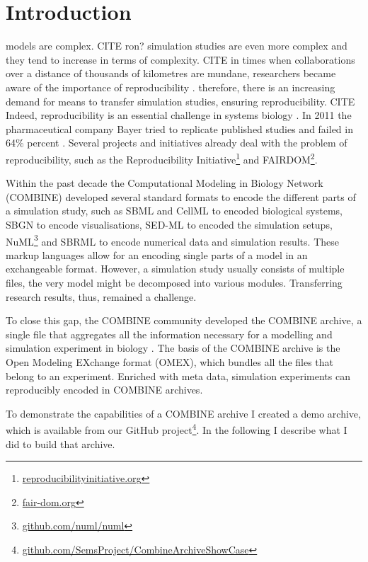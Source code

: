 
\section{Introduction}

models are complex. CITE ron?
simulation studies are even more complex and they tend to increase in terms of complexity. CITE
in times when collaborations over a distance of thousands of kilometres are mundane, researchers became aware of the importance of reproducibility \cite{Sandve2013}.
therefore, there is an increasing demand for means to transfer simulation studies, ensuring reproducibility. CITE
Indeed, reproducibility is an essential challenge in systems biology \cite{Mesirov2010}.
In 2011 the pharmaceutical company Bayer tried to replicate published studies and failed in 64\% percent \cite{Prinz2011}.
Several projects and initiatives already deal with the problem of reproducibility, such as the Reproducibility Initiative\footnote{\href{http://reproducibilityinitiative.org/}{reproducibilityinitiative.org}} and FAIRDOM\footnote{\href{http://fair-dom.org/}{fair-dom.org}}.

Within the past decade the Computational Modeling in Biology Network (COMBINE) developed several standard formats to encode the different parts of a simulation study, such as SBML \cite{Hucka2003} and CellML \cite{Cuellar2003a} to encoded biological systems, SBGN \cite{sbgn} to encode visualisations, SED-ML \cite{Waltemath2011} to encoded the simulation setups, NuML\footnote{\href{https://github.com/numl/numl}{github.com/numl/numl}} and SBRML \cite{Dada2010} to encode numerical data and simulation results.
These markup languages allow for an encoding single parts of a model in an exchangeable format.
However, a simulation study usually consists of multiple files, the very model might be decomposed into various modules.
Transferring research results, thus, remained a challenge.

To close this gap, the COMBINE community developed the COMBINE archive, a single file that aggregates all the information necessary for a modelling and simulation experiment in biology \cite{Bergmann2014}.
The basis of the COMBINE archive is the Open Modeling EXchange format (OMEX), which bundles all the files that belong to an experiment.
Enriched with meta data, simulation experiments can reproducibly encoded in COMBINE archives.

To demonstrate the capabilities of a COMBINE archive I created a demo archive, which is available from our GitHub project\footnote{\href{https://github.com/SemsProject/CombineArchiveShowCase}{github.com/SemsProject/CombineArchiveShowCase}}.
In the following I describe what I did to build that archive.

